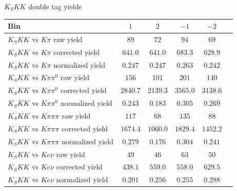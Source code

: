 \documentclass{beamer}
\begin{document}
\begin{frame}{$K_SKK$ double tag yields}
  \centering
  \def\arraystretch{1.2}%
  \begin{tabular}{l|ccccc}
    Bin                                        & $1$      & $2$      & $-1$     & $-2$ \\
    \hline
    $K_SKK$ vs $K\pi$ raw yield                & $89$     & $72$     & $94$     & $69$ \\
    $K_SKK$ vs $K\pi$ corrected yield          & $641.0$  & $641.0$  & $683.3$  & $628.9$ \\
    $K_SKK$ vs $K\pi$ normalized yield         & $0.247$  & $0.247$  & $0.263$  & $0.242$ \\
    \hline
    $K_SKK$ vs $K\pi\pi^0$ raw yield           & $156$    & $101$    & $201$    & $140$ \\
    $K_SKK$ vs $K\pi\pi^0$ corrected yield     & $2840.7$ & $2139.3$ & $3565.0$ & $3138.6$ \\
    $K_SKK$ vs $K\pi\pi^0$ normalized yield    & $0.243$  & $0.183$  & $0.305$  & $0.269$ \\
    \hline
    $K_SKK$ vs $K\pi\pi\pi$ raw yield          & $117$    & $68$     & $135$    & $88$ \\
    $K_SKK$ vs $K\pi\pi\pi$ corrected yield    & $1674.4$ & $1060.0$ & $1829.4$ & $1452.2$ \\
    $K_SKK$ vs $K\pi\pi\pi$ normalized yield   & $0.279$  & $0.176$  & $0.304$  & $0.241$ \\
    \hline
    $K_SKK$ vs $Ke\nu$ raw yield               & $49$     & $46$     & $63$     & $50$ \\
    $K_SKK$ vs $Ke\nu$ corrected yield         & $438.1$  & $559.0$  & $558.0$  & $629.5$ \\
    $K_SKK$ vs $Ke\nu$ normalized yield        & $0.201$  & $0.256$  & $0.255$  & $0.288$ \\
    \hline
  \end{tabular}
\end{frame}
\end{document}
